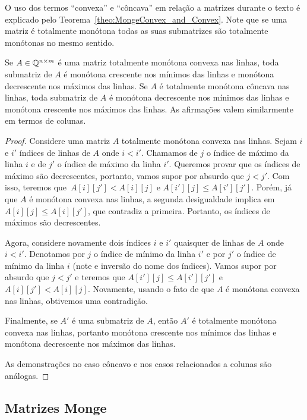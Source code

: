 O uso dos termos ``convexa'' e ``côncava'' em relação a matrizes durante o texto é explicado pelo Teorema~\ref{theo:MongeConvex_and_Convex}. Note que se uma matriz é totalmente monótona todas as suas submatrizes são totalmente monótonas no mesmo sentido.

\begin{lema} \label{lema:MonotoneTotallyMonotone}
Se $A \in \mathbb{Q}^{n \times m}$ é uma matriz totalmente monótona convexa nas linhas, toda submatriz de $A$ é monótona crescente nos mínimos das linhas e monótona decrescente nos máximos das linhas. Se $A$ é totalmente monótona côncava nas linhas, toda submatriz de $A$ é monótona decrescente nos mínimos das linhas e monótona crescente nos máximos das linhas. As afirmações valem similarmente em termos de colunas.
\end{lema}

\begin{proof}
Considere uma matriz $A$ totalmente monótona convexa nas linhas. Sejam $i$ e $i'$ índices de linhas de $A$ onde $i < i'$. Chamamos de $j$ o índice de máximo da linha $i$ e de $j'$ o índice de máximo da linha $i'$. Queremos provar que os índices de máximo são decrescentes, portanto, vamos supor por absurdo que $j < j'$. Com isso, teremos que~${ A[i][j'] < A[i][j] }$ e $A[i'][j] \leq A[i'][j']$. Porém, já que $A$ é monótona convexa nas linhas, a segunda desigualdade implica em $A[i][j] \leq A[i][j']$, que contradiz a primeira. Portanto, os índices de máximos são decrescentes.  

Agora, considere novamente dois índices $i$ e $i'$ quaisquer de linhas de $A$ onde $i < i'$. Denotamos por $j$ o índice de mínimo da linha $i'$ e por $j'$ o índice de mínimo da linha $i$ (note e inversão do nome dos índices). Vamos supor por absurdo que $j < j'$ e teremos que $A[i'][j] \leq A[i'][j']$ e $A[i][j'] < A[i][j]$. Novamente, usando o fato de que $A$ é monótona convexa nas linhas, obtivemos uma contradição.  

Finalmente, se $A'$ é uma submatriz de $A$, então $A'$ é totalmente monótona convexa nas linhas, portanto monótona crescente nos mínimos das linhas e monótona decrescente nos máximos das linhas.

As demonstrações no caso côncavo e nos casos relacionados a colunas são análogas.
\end{proof}

\subsection{Matrizes Monge} \label{Monge:Monge}

